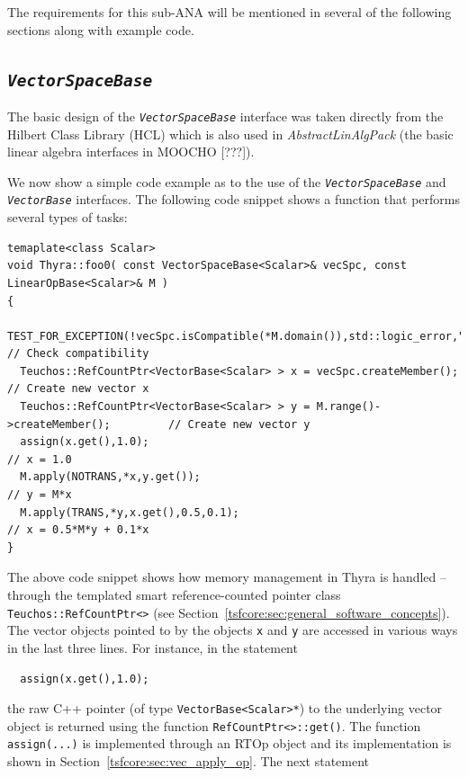 \documentclass[pdf,ps2pdf,11pt]{SANDreport}
\begin{document}
The requirements for this sub-ANA will be mentioned in several of the
following sections along with example code.

%
\subsection{\texttt{\textit{Vector\-Space\-Base}}}
\label{tsfcore:sec:vec_space}
%

The basic design of the {}\texttt{\textit{Vector\-Space\-Base}} interface was
taken directly from the Hilbert Class Library (HCL) {}\cite{ref:hcl}
which is also used in {}\textit{AbstractLinAlgPack} (the basic linear
algebra interfaces in MOOCHO [???]).

We now show a simple code example as to the use of the
{}\texttt{\textit{Vector\-Space\-Base}} and {}\texttt{\textit{Vector\-Base}}
interfaces.  The following code snippet shows a function that performs
several types of tasks:

{\scriptsize\begin{verbatim}
temaplate<class Scalar>
void Thyra::foo0( const VectorSpaceBase<Scalar>& vecSpc, const LinearOpBase<Scalar>& M )
{
  TEST_FOR_EXCEPTION(!vecSpc.isCompatible(*M.domain()),std::logic_error,"Error!"); // Check compatibility
  Teuchos::RefCountPtr<VectorBase<Scalar> > x = vecSpc.createMember();             // Create new vector x
  Teuchos::RefCountPtr<VectorBase<Scalar> > y = M.range()->createMember();         // Create new vector y
  assign(x.get(),1.0);                                                             // x = 1.0
  M.apply(NOTRANS,*x,y.get());                                                     // y = M*x
  M.apply(TRANS,*y,x.get(),0.5,0.1);                                               // x = 0.5*M*y + 0.1*x
}
\end{verbatim}}

{}\noindent{}The above code snippet shows how memory management in Thyra is
handled -- through the templated smart reference-counted pointer class
{}\texttt{Teuchos\-::RefCountPtr<>} (see
Section~\ref{tsfcore:sec:general_software_concepts}).  The vector objects
pointed to by the objects {}\texttt{x} and {}\texttt{y} are accessed in
various ways in the last three lines.  For instance, in the statement

{\scriptsize\begin{verbatim}
  assign(x.get(),1.0);
\end{verbatim}}

{}\noindent{}the raw C++ pointer (of type {}\texttt{VectorBase<Scalar>*}) to the
underlying vector object is returned using the function
{}\texttt{RefCountPtr<>\-::get()}.  The function {}\texttt{assign(...)} is
implemented through an RTOp object and its implementation is shown in
Section~\ref{tsfcore:sec:vec_apply_op}.  The next statement
\end{document}
